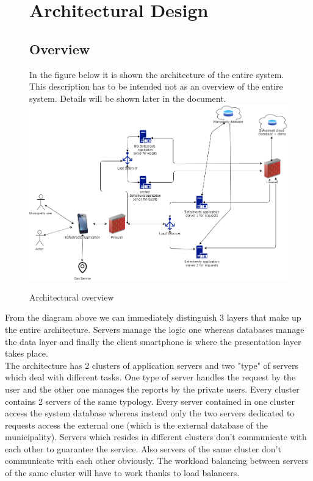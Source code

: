 \documentclass[titlepage]{article}
\begin{document}
\begin{figure}[h]
\section{Architectural Design}
	\subsection{Overview}
In the figure below it is shown the architecture of the entire system. This description has to be intended not as an overview of the entire system. Details will be shown later in the document.
	\includegraphics[scale=0.465]{Diagrams/overview.png}
	\caption{Architectural overview}
\end{figure}
\FloatBarrier
From the diagram above we can immediately distinguish 3 layers that make up the entire architecture.
Servers manage the logic one whereas databases manage the data layer and finally the client smartphone is where the presentation layer takes place. \\
The architecture has 2 clusters of application servers and two "type" of servers which deal with different tasks. One type of server handles the request by the user and the other one manages the reports by the private users. Every cluster contains 2 servers of the same typology. Every server contained in one cluster access the system database whereas instead only the two servers dedicated to requests access the external one (which is the external database of the municipality). Servers which resides in different clusters don't communicate with each other to guarantee the service. Also servers of the same cluster don't communicate with each other obviously. The workload balancing between servers of the same cluster will have to work thanks to load balancers.\\
\end{document}
